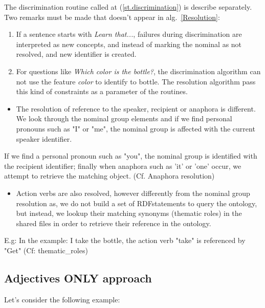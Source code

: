 \documentclass[twoside,a4paper,10pt]{report}
\newcommand{\dokutitleleveltree}[1]{\subsection{#1}}
\newcommand{\dokufootmark}[1]{\footnotemark[#1]}
\begin{document}
The discrimination routine called at (\ref{st.discrimination}) is describe separately. 
Two remarks must be made that doesn't appear in alg.~\ref{Resolution}:
\begin{enumerate}
    \item If a sentence starts with {\it Learn that...}, failures during 
    discrimination are interpreted as new concepts, and instead of marking the 
    nominal as not resolved, and new identifier is created.
    \item For questions like {\it Which color is the bottle?}, the discrimination 
    algorithm can not use the feature {\it color} to identify to bottle. The 
    resolution algorithm pass this kind of constraints as a parameter of the 
     routines.
\end{enumerate}

\begin{itemize}
\item  The resolution of reference to the speaker, recipient or anaphora is different. We look through the nominal group elements and if we find personal pronouns such as "I" or "me", the nominal group is affected with the current speaker identifier.
\end{itemize}

 If we find a personal pronoun such as "you", the nominal group is identified with the recipient identifier; finally when anaphora such as 'it' or 'one' occur, we attempt to retrieve the matching object. (Cf. Anaphora resolution)

\begin{itemize}
\item  Action verbs are also resolved, however differently from the nominal group resolution as, we do not build a set of RDF\dokufootmark{1} statements to query the ontology, but instead, we lookup their matching synonyms (thematic roles) in the shared files in order to retrieve their reference in the ontology.
\end{itemize}


\small
\begin{verbatimtab}
  E.g:
  In the example: I take the bottle, the action verb "take" is referenced by "Get"
  (Cf: thematic_roles)
\end{verbatimtab}
\normalsize

\dokutitleleveltree{Adjectives ONLY approach}
\label{7ab02d5628e7f210c5eb8e862e7ddc56}%

Let's consider the following example:
\end{document}
